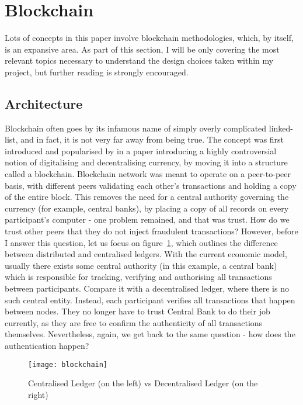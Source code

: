 \section{Blockchain}

Lots of concepts in this paper involve blockchain methodologies, which, by itself, is an expansive area. As part of this section, I will be only covering the most relevant topics necessary to understand the design choices taken within my project, but further reading is strongly encouraged.

\subsection{Architecture}
Blockchain often goes by its infamous name of simply overly complicated linked-list, and in fact, it is not very far away from being true. The concept was first introduced and popularised by \citet{nakamoto2008peer} in a paper introducing a highly controversial notion of digitalising and decentralising currency, by moving it into a structure called a blockchain. Blockchain network was meant to operate on a peer-to-peer basis, with different peers validating each other's transactions and holding a copy of the entire block. This removes the need for a central authority governing the currency (for example, central banks), by placing a copy of all records on every participant's computer - one problem remained, and that was trust. How do we trust other peers that they do not inject fraudulent transactions? However, before I answer this question, let us focus on figure~\ref{fig:blockchain}, which outlines the difference between distributed and centralised ledgers. With the current economic model, usually there exists some central authority (in this example, a central bank) which is responsible for tracking, verifying and authorising all transactions between participants. Compare it with a decentralised ledger, where there is no such central entity. Instead, each participant verifies all transactions that happen between nodes. They no longer have to trust Central Bank to do their job currently, as they are free to confirm the authenticity of all transactions themselves. Nevertheless, again, we get back to the same question - how does the authentication happen?

\begin{figure}[ht]
    \centering
    \texttt{[image: blockchain]}
    \caption{Centralised Ledger (on the left) vs Decentralised Ledger (on the right)}
    \label{fig:blockchain}
\end{figure}

